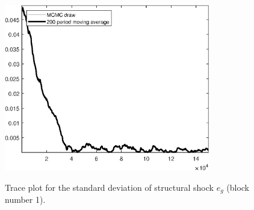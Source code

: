 \begin{figure}[H]
\centering
  \includegraphics[width=0.8\textwidth]{BRS_sectoral_wo_gmf/graphs/TracePlot_SE_e_g_blck_1}\\
    \caption{Trace plot for the standard deviation of structural shock ${e_g}$ (block number 1).}
\end{figure}
